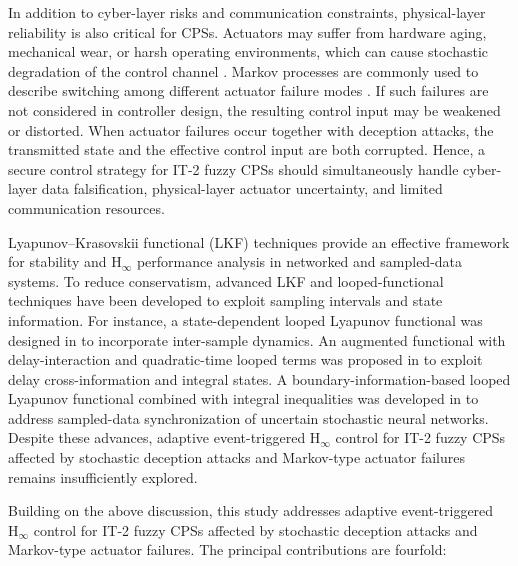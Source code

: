 \documentclass[preprint,review,fleqn,sort&compress,3p]{elsarticle}
\theoremstyle{definition} %
\theoremstyle{definition}%
\begin{document}
In addition to cyber-layer risks and communication constraints, physical-layer
reliability is also critical for CPSs. Actuators may suffer from hardware aging,
mechanical wear, or harsh operating environments, which can cause stochastic
degradation of the control channel
\cite{chenProbabilisticEventTriggeredPolicy2023,caiAdaptiveFaulttolerantControl2025}.
Markov processes are commonly used to describe switching among different actuator
failure modes \cite{yaoMultiSensorBasedSwitchingEventTriggered2024,xuAsynchronousEventTriggeredControl2024}.
If such failures are not considered in controller design, the resulting control
input may be weakened or distorted. When actuator failures occur together with
deception attacks, the
transmitted state and the effective control input are both corrupted. Hence, a
secure control strategy for IT-2 fuzzy CPSs should simultaneously handle
cyber-layer data falsification, physical-layer actuator uncertainty, and limited
communication resources.

Lyapunov--Krasovskii functional (LKF) techniques provide an effective framework for stability and $\mathrm{H}_\infty$ performance analysis in networked and sampled-data systems. To reduce conservatism, advanced LKF and looped-functional techniques
have been developed to exploit sampling intervals and state information. For
instance, a state-dependent looped Lyapunov functional was designed in
\cite{lianNewResultsStability2020} to incorporate inter-sample dynamics. An
augmented functional with delay-interaction and quadratic-time looped terms was
proposed in \cite{zhangMixedDelayBasedAugmentedFunctional2024} to exploit delay
cross-information and integral states. A boundary-information-based looped
Lyapunov functional combined with integral inequalities was developed in
\cite{ganesanSynchronizationStochasticNeural2024} to address sampled-data synchronization of uncertain stochastic neural networks. Despite these advances, adaptive event-triggered $\mathrm{H}_\infty$ control for IT-2 fuzzy CPSs affected by stochastic deception attacks and Markov-type actuator failures remains insufficiently explored.

Building on the above discussion, this study addresses adaptive event-triggered
$\mathrm{H}_\infty$ control for IT-2 fuzzy CPSs affected by stochastic deception
attacks and Markov-type actuator failures. The principal contributions are fourfold:
\end{document}
